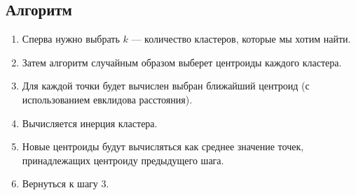 \subsection{Алгоритм}

\begin{enumerate}

\item Сперва нужно выбрать $k$ --- количество кластеров, которые мы хотим найти.

\item Затем алгоритм случайным образом выберет центроиды каждого кластера.

\item Для каждой точки будет вычислен выбран ближайший центроид (с использованием евклидова расстояния).

\item Вычисляется инерция кластера.

\item Новые центроиды будут вычисляться как среднее значение точек, принадлежащих центроиду предыдущего шага.

\item Вернуться к шагу 3.

\end{enumerate}